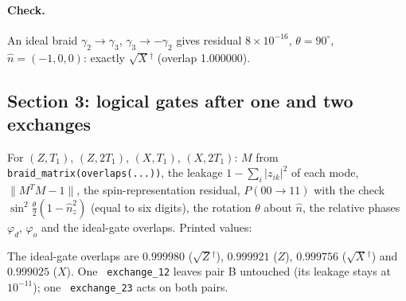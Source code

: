 \documentclass[11pt]{article}
\renewcommand{\code}[1]{\texttt{\hyphenchar\font=-1 #1}}
\begin{document}
\paragraph{Check.} An ideal braid $\gamma_2\to\gamma_3$, $\gamma_3\to-\gamma_2$ gives residual $8\times10^{-16}$, $\theta = 90^\circ$, $\hat n = (-1, 0, 0)$:
exactly $\sqrt{X}{}^\dagger$ (overlap 1.000000).

\subsection{Section 3: logical gates after one and two exchanges}

For $(Z, T_1)$, $(Z, 2T_1)$, $(X, T_1)$, $(X, 2T_1)$: $M$ from \code{braid\_matrix(overlaps(...))}, the leakage $1-\sum_i|z_{ik}|^2$ of each mode,
$\|M^TM - 1\|$, the spin-representation residual, $P(00\to11)$ with the check $\sin^2\frac\theta2(1-\hat n_z^2)$ (equal to six digits), the
rotation $\theta$ about $\hat n$, the relative phases $\varphi_d$, $\varphi_o$ and the ideal-gate overlaps. Printed values:

\begin{center}
\end{center}

The ideal-gate overlaps are $0.999980$ ($\sqrt{Z}{}^\dagger$), $0.999921$ ($Z$), $0.999756$ ($\sqrt{X}{}^\dagger$) and $0.999025$ ($X$). One
\code{exchange\_12} leaves pair B untouched (its leakage stays at $10^{-11}$); one \code{exchange\_23} acts on both pairs.
\end{document}
